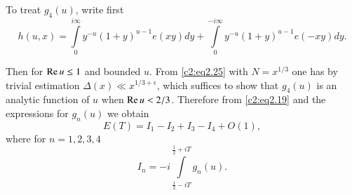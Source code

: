 To treat $g_4 (u)$, write first
$$
h(u, x)= \int\limits_0^{i \infty} y^{-u} (1+ y)^{u-1} e(xy)dy +
\int\limits_0^{- i \infty} y^{-u} (1+ y)^{u-1} e(-xy)dy.
$$

Then 
{}
for $\operatorname{Re} u \leq 1$ and bounded $u$. From \eqref{c2:eq2.25} with $N=
  x^{1/3}$ one has by trivial estimation $\Delta  (x) \ll x^{1/3+
    \epsilon}$, which suffices to show that $g_4 (u)$ is an analytic
  function of $u$ when $\operatorname{Re} u < 2/3$. Therefore from \eqref{c2:eq2.19}
  and the expressions for $g_n (u)$ we obtain
\begin{equation}
  E(T)= I_1 - I_2 + I_3 - I_4 + O(1), \label{c2:eq2.29}
\end{equation}
where for $n= 1, 2, 3, 4$
\begin{equation}
I_n = -i \int\limits_{\frac{1}{2} - iT}^{\frac{1}{2} + iT} g_n
(u).\label{c2:eq2.30} 
\end{equation}

